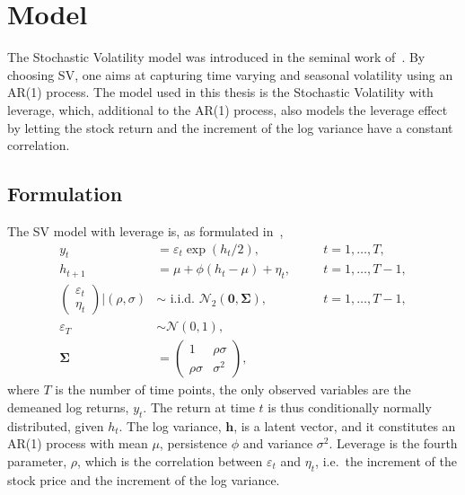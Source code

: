 \newcommand*{\yts}{y_t^\ast}
\newcommand*{\ets}{\varepsilon_t^\ast}

\section{Model}

The Stochastic Volatility model was introduced in the seminal work of~\citet{Taylor1982}.
By choosing SV, one aims at capturing time varying and seasonal volatility using an AR(1) process.
The model used in this thesis is the Stochastic Volatility with leverage, which, additional to the AR(1) process, also models the leverage effect by letting the stock return and the increment of the log variance have a constant correlation.

\subsection{Formulation}

The SV model with leverage is, as formulated in~\citet{Omori2007},
\begin{equation}
\begin{alignedat}{2}\label{form:orig_model}
y_t & = \varepsilon_t\exp\left(h_t/2\right), && \quad t=1,\dots,T, \\
h_{t+1} & = \mu+\phi(h_t-\mu)+\eta_t, && \quad t=1,\dots,T-1, \\
\begin{pmatrix}
\varepsilon_t \\
\eta_t
\end{pmatrix}
\bigg\vert\left(\rho,\sigma\right) & \sim\text{ i.i.d. }\mathcal{N}_2\left(\bm{0},\bm{\Sigma}\right), && \quad t=1,\dots,T-1, \\
\varepsilon_T &\sim\mathcal{N}(0,1), \\
\bm{\Sigma} & =
\begin{pmatrix}
1 & \rho\sigma \\
\rho\sigma & \sigma^2
\end{pmatrix},
\end{alignedat}
\end{equation}
where $T$ is the number of time points, the only observed variables are the demeaned log returns, $y_t$.
The return at time $t$ is thus conditionally normally distributed, given $h_t$.
The log variance, $\bm{h}$, is a latent vector, and it constitutes an AR(1) process with mean $\mu$, persistence $\phi$ and variance $\sigma^2$.
Leverage is the fourth parameter, $\rho$, which is the correlation between $\varepsilon_t$ and $\eta_t$, i.e.\ the increment of the stock price and the increment of the log variance.

